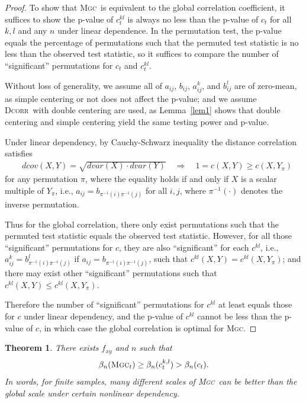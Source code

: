 \documentclass[11pt]{article}
\providecommand{\sct}[1]{{\normalfont\textsc{#1}}}
\newcommand{\G}{c}
\newcommand{\Mgc}{\sct{Mgc}}
\newcommand{\Dcorr}{\sct{Dcorr}}
\newtheorem{appThm}{Theorem}
\begin{document}
\begin{proof}
To show that \Mgc~is equivalent to the global correlation coefficient, it suffices to show the p-value of $\G^{kl}_t$ is always no less than the p-value of $\G_t$ for all $k,l$ and any $n$ under linear dependence. In the permutation test, the p-value equals the percentage of permutations such that the permuted test statistic is no less than the observed test statistic, so it suffices to compare the number of ``significant'' permutations for $\G_t$ and $\G^{kl}_t$.

Without loss of generality, we assume all of $a_{ij}$, $b_{ij}$, $a_{ij}^{k}$, and $b_{ij}^{l}$ are of zero-mean, as simple centering or not does not affect the p-value; and we assume \Dcorr~with double centering are used, as Lemma~\ref{lem1} shows that double centering and simple centering yield the same testing power and p-value.

Under linear dependency, by Cauchy-Schwarz inequality the distance correlation satisfies
\begin{align*}
& dcov(X,Y) = \sqrt{dvar(X) \cdot dvar(Y)} \quad\Rightarrow\quad 1=\G(X, Y) \geq \G(X, Y_{\pi})
\end{align*}
for any permutation $\pi$, where the equality holds if and only if $X$ is a scalar multiple of $Y_{\pi}$, i.e., $a_{ij}=b_{\pi^{-1}(i) \pi^{-1}(j)}$ for all $i,j$, where $\pi^{-1}(\cdot)$ denotes the inverse permutation. %

Thus for the global correlation, there only exist permutations such that the permuted test statistic equals the observed test statistic. However, for all those ``significant'' permutations for $\G$, they are also ``significant'' for each $\G^{kl}$, i.e., $a_{ij}^{k}=b_{\pi^{-1}(i) \pi^{-1}(j)}^{l}$ if $a_{ij}=b_{\pi^{-1}(i) \pi^{-1}(j)}$, such that $\G^{kl}(X, Y)=\G^{kl}(X, Y_{\pi})$; and there may exist other ``significant'' permutations such that $\G^{kl}(X, Y) \leq \G^{kl}(X, Y_{\pi})$.

Therefore the number of ``significant'' permutations for $\G^{kl}$ at least equals those for $\G$ under linear dependency, and the p-value of $\G^{kl}$ cannot be less than the p-value of $\G$, in which case the global correlation is optimal for \Mgc. 
\end{proof}

\begin{appThm}
There exists $f_{xy}$ and $n$ such that
\begin{equation}
\beta_n(\Mgc_{t}) \geq \beta_n(\G^{k,l}_{t}) > \beta_n(\G_{t}).
\end{equation}
In words, for finite samples, many different scales of \Mgc~can be better than the global scale under certain nonlinear dependency.
\end{appThm}
\end{document}
